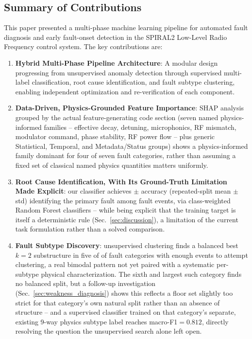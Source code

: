 
\label{sec:conclusion}

\subsection{Summary of Contributions}

This paper presented a multi-phase machine learning pipeline for automated fault diagnosis and early fault-onset detection in the SPIRAL2 Low-Level Radio Frequency control system. The key contributions are:

\begin{enumerate}
    \item \textbf{Hybrid Multi-Phase Pipeline Architecture}: A modular design progressing from unsupervised anomaly detection through supervised multi-label classification, root cause identification, and fault subtype clustering, enabling independent optimization and re-verification of each component.

    \item \textbf{Data-Driven, Physics-Grounded Feature Importance}: SHAP analysis grouped by the actual feature-generating code section (seven named physics-informed families -- effective decay, detuning, microphonics, RF mismatch, modulator command, phase stability, RF power flow -- plus generic Statistical, Temporal, and Metadata/Status groups) shows a physics-informed family dominant for four of seven fault categories, rather than assuming a fixed set of classical named physics quantities matters uniformly.

    \item \textbf{Root Cause Identification, With Its Ground-Truth Limitation Made Explicit}: our classifier achieves \MetricZeroEightPhaseThreeaRootcauseStabilityAccuracyMean$\pm$\MetricZeroEightPhaseThreeaRootcauseStabilityAccuracyStd{} accuracy (repeated-split mean $\pm$ std) identifying the primary fault among \MetricZeroEightPhaseThreeaRootcauseNFaultEvents{} fault events, via class-weighted Random Forest classifiers -- while being explicit that the training target is itself a deterministic rule (Sec.~\ref{sec:discussion}), a limitation of the current task formulation rather than a solved comparison.

    \item \textbf{Fault Subtype Discovery}: unsupervised clustering finds a balanced best $k=2$ substructure in five of \MetricZeroNinecEnhancedSubclassDiscoveryNCategoriesAnalyzed{} of \MetricZeroNinecEnhancedSubclassDiscoveryNCategoriesTotal{} fault categories with enough events to attempt clustering, a real bimodal pattern not yet paired with a systematic per-subtype physical characterization. The sixth and largest such category finds no balanced split, but a follow-up investigation (Sec.~\ref{sec:weakness_diagnosis}) shows this reflects a floor set slightly too strict for that category's own natural split rather than an absence of structure -- and a supervised classifier trained on that category's separate, existing 9-way physics subtype label reaches macro-F1$=0.812$, directly resolving the question the unsupervised search alone left open.


\end{enumerate}
